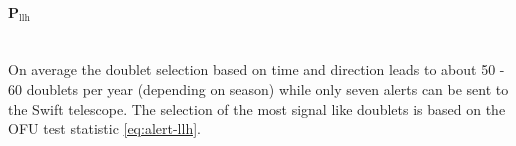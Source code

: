 \paragraph{P$_{\text{llh}}$}$\;$\\
On average the doublet selection based on time and direction leads to about 50 -
60
doublets per year (depending on season) while only seven alerts can be sent to
the Swift telescope. The
selection of the most signal like doublets is based on the OFU test statistic 
\ref{eq:alert-llh}.
% 

